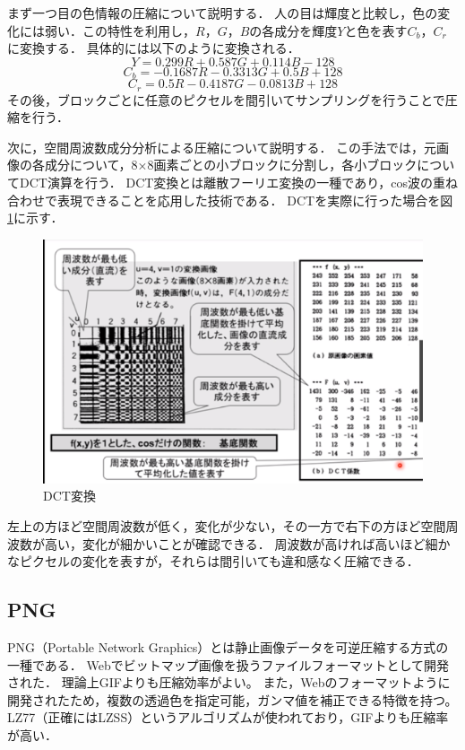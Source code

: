 \documentclass[a4paper,11pt]{bxjsarticle}
\begin{document}
まず一つ目の色情報の圧縮について説明する．
人の目は輝度と比較し，色の変化には弱い．この特性を利用し，$R$，$G$，$B$の各成分を輝度$Y$と色を表す$C_b$，$C_r$に変換する．
具体的には以下のように変換される．\cite{jpeg2}
\begin{equation}
  Y = 0.299R + 0.587G + 0.114B - 128
\end{equation}
\begin{equation}
  C_b = - 0.1687R - 0.3313G + 0.5B + 128
\end{equation}
\begin{equation}
  C_r = 0.5R - 0.4187G - 0.0813B + 128
\end{equation}
その後，ブロックごとに任意のピクセルを間引いてサンプリングを行うことで圧縮を行う．

次に，空間周波数成分分析による圧縮について説明する．
この手法では，元画像の各成分について，8×8画素ごとの小ブロックに分割し，各小ブロックについてDCT演算を行う．
DCT変換とは離散フーリエ変換の一種であり，cos波の重ね合わせで表現できることを応用した技術である．
DCTを実際に行った場合を図\ref{fig:dct}に示す．\cite{jpeg1}

\begin{figure}[htbp]
  \centering  %
  \includegraphics[clip,width = 12.0cm]{dct_con.eps}
  \caption{DCT変換}
  \label{fig:dct}
  \end{figure}

左上の方ほど空間周波数が低く，変化が少ない，その一方で右下の方ほど空間周波数が高い，変化が細かいことが確認できる．
周波数が高ければ高いほど細かなピクセルの変化を表すが，それらは間引いても違和感なく圧縮できる．



\subsection{PNG}
PNG（Portable Network Graphics）とは静止画像データを可逆圧縮する方式の一種である．
Webでビットマップ画像を扱うファイルフォーマットとして開発された．
理論上GIFよりも圧縮効率がよい。
また，Webのフォーマットように開発されたため，複数の透過色を指定可能，ガンマ値を補正できる特徴を持つ。
LZ77（正確にはLZSS）というアルゴリズムが使われており，GIFよりも圧縮率が高い．
\end{document}
